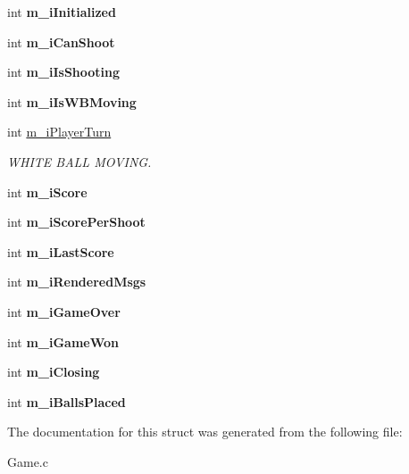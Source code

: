 \begin{DoxyCompactItemize}
\mbox{\label{struct_c_game_a8e9a60d4240db4c86371abcbf6421bda}} 
int {\bfseries m\+\_\+i\+Initialized}
\item 
\mbox{\label{struct_c_game_a18b8c038f82f6b00e7020feeac8fc59a}} 
int {\bfseries m\+\_\+i\+Can\+Shoot}
\item 
\mbox{\label{struct_c_game_aea69eebb5133bd0a222f932645a9c196}} 
int {\bfseries m\+\_\+i\+Is\+Shooting}
\item 
\mbox{\label{struct_c_game_afda84ba6a433baafe82fd98a6cb75650}} 
int {\bfseries m\+\_\+i\+Is\+W\+B\+Moving}
\item 
\mbox{\label{struct_c_game_aefb0390a7cc72b48bf24ad8aa07f078b}} 
int \hyperlink{struct_c_game_aefb0390a7cc72b48bf24ad8aa07f078b}{m\+\_\+i\+Player\+Turn}
\begin{DoxyCompactList}\small\item\em W\+H\+I\+TE B\+A\+LL M\+O\+V\+I\+NG. \end{DoxyCompactList}\item 
\mbox{\label{struct_c_game_a47e0c27bdf63ef0e442a5a41ab5e9a2e}} 
int {\bfseries m\+\_\+i\+Score}
\item 
\mbox{\label{struct_c_game_af2023f6807ac246dc4146b70db6d9f38}} 
int {\bfseries m\+\_\+i\+Score\+Per\+Shoot}
\item 
\mbox{\label{struct_c_game_a6dff5ac3a4487051315b2bf98bdaedae}} 
int {\bfseries m\+\_\+i\+Last\+Score}
\item 
\mbox{\label{struct_c_game_a8a2440d3a87ccb4e8bce2198695d8178}} 
int {\bfseries m\+\_\+i\+Rendered\+Msgs}
\item 
\mbox{\label{struct_c_game_a89fd17a46e7a6eaf7bb0b072299f02b0}} 
int {\bfseries m\+\_\+i\+Game\+Over}
\item 
\mbox{\label{struct_c_game_ae10010b35e8b1fd720c56fc85f81620d}} 
int {\bfseries m\+\_\+i\+Game\+Won}
\item 
\mbox{\label{struct_c_game_ad676e4202cc361e6af3d9c3e622ee87a}} 
int {\bfseries m\+\_\+i\+Closing}
\item 
\mbox{\label{struct_c_game_a548351e283e938d353a5b86524931428}} 
int {\bfseries m\+\_\+i\+Balls\+Placed}
\end{DoxyCompactItemize}


The documentation for this struct was generated from the following file\+:\begin{DoxyCompactItemize}
\item 
Game.\+c\end{DoxyCompactItemize}
